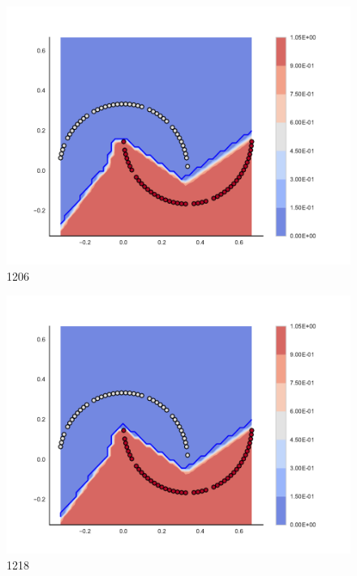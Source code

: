 \begin{subfigure}[b]{0.09\textwidth}
    \includegraphics[clip, trim=2.35cm 1.75cm 4.5cm 0cm,width=\textwidth]{img/convergence/1206.pdf}
    \caption{1206}
    \label{fig:convergence_1206}
\end{subfigure}
%
\begin{subfigure}[b]{0.09\textwidth}
    \includegraphics[clip, trim=2.35cm 1.75cm 4.5cm 0cm,width=\textwidth]{img/convergence/1218.pdf}
    \caption{1218}
    \label{fig:convergence_1218}
\end{subfigure}
%
